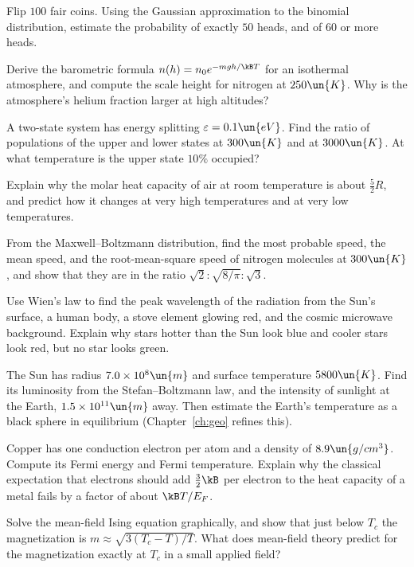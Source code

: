 \begin{problems}
 Flip $100$ fair coins. Using the Gaussian approximation to the binomial distribution, estimate the probability of exactly $50$ heads, and of $60$ or more heads.

\core Derive the barometric formula $n(h) = n_0e^{-mgh/\kB T}$ for an isothermal atmosphere, and compute the scale height for nitrogen at $250\un{K}$. Why is the atmosphere's helium fraction larger at high altitudes?

 A two-state system has energy splitting $\varepsilon = 0.1\un{eV}$. Find the ratio of populations of the upper and lower states at $300\un{K}$ and at $3000\un{K}$. At what temperature is the upper state $10\%$ occupied?

 Explain why the molar heat capacity of air at room temperature is about $\tfrac52R$, and predict how it changes at very high temperatures and at very low temperatures.

 From the Maxwell--Boltzmann distribution, find the most probable speed, the mean speed, and the root-mean-square speed of nitrogen molecules at $300\un{K}$, and show that they are in the ratio $\sqrt2:\sqrt{8/\pi}:\sqrt3$.

\core Use Wien's law to find the peak wavelength of the radiation from the Sun's surface, a human body, a stove element glowing red, and the cosmic microwave background. Explain why stars hotter than the Sun look blue and cooler stars look red, but no star looks green.

 The Sun has radius $7.0\times10^{8}\un{m}$ and surface temperature $5800\un{K}$. Find its luminosity from the Stefan--Boltzmann law, and the intensity of sunlight at the Earth, $1.5\times10^{11}\un{m}$ away. Then estimate the Earth's temperature as a black sphere in equilibrium (Chapter~\ref{ch:geo} refines this).

\core Copper has one conduction electron per atom and a density of $8.9\un{g/cm^3}$. Compute its Fermi energy and Fermi temperature. Explain why the classical expectation that electrons should add $\tfrac32\kB$ per electron to the heat capacity of a metal fails by a factor of about $\kB T/E_F$.

 Solve the mean-field Ising equation graphically, and show that just below $T_c$ the magnetization is $m\approx\sqrt{3(T_c-T)/T}$. What does mean-field theory predict for the magnetization exactly at $T_c$ in a small applied field?


\end{problems}
